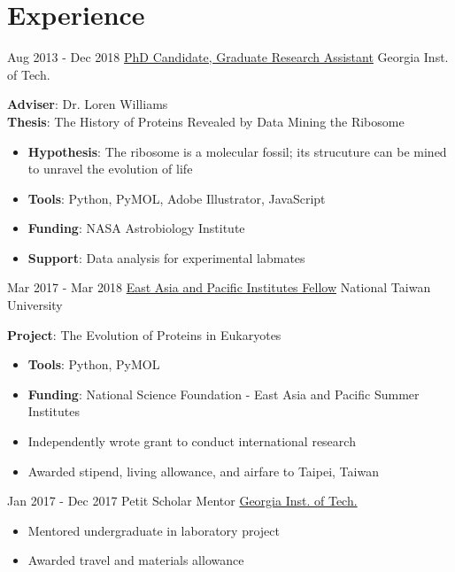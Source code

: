\documentclass[letterpaper]{twentysecondcv} %
\begin{document}
\section{Experience}
\begin{twenty}
	\twentyitem
    	{Aug 2013 -}
		{Dec 2018}
        {\href{https://ww2.chemistry.gatech.edu/~lw26/}{PhD Candidate, Graduate Research Assistant}}
        {Georgia Inst. of Tech.}
        {}
        {
        \textbf{Adviser}: Dr. Loren Williams \\ 
        \textbf{Thesis}: The History of Proteins Revealed by Data Mining the Ribosome
        {\begin{itemize}
        \item \textbf{Hypothesis}: The ribosome is a molecular fossil; its strucuture can be mined to unravel the evolution of life 
        \item \textbf{Tools}: Python, PyMOL, Adobe Illustrator, JavaScript
        \item \textbf{Funding}: NASA Astrobiology Institute
        \item \textbf{Support}: Data analysis for experimental labmates
 \vspace{4mm}
		\end{itemize}}
        }

	\twentyitem
    	{Mar 2017 -}
		{Mar 2018}
        {\href{https://www.nsf.gov/funding/pgm_summ.jsp?pims_id=5284}{East Asia and Pacific Institutes Fellow}}
        {National Taiwan University}
        {}
        {
\vspace{-3mm}
		\textbf{Project}: The Evolution of Proteins in Eukaryotes
        {\begin{itemize}
        \item \textbf{Tools}: Python, PyMOL
        \item \textbf{Funding}: National Science Foundation \scriptsize{- East Asia and Pacific Summer Institutes}
        \item \normalsize{Independently wrote grant to conduct international research}
        \item Awarded stipend, living allowance, and airfare to Taipei, Taiwan
 \vspace{4mm}
		\end{itemize}}
        }

	\twentyitem
    	{Jan 2017 -}
		{Dec 2017}
        {Petit Scholar Mentor}
        {\href{http://petitinstitute.gatech.edu/become-petit-scholar-mentor}{Georgia Inst. of Tech.}}
        {}
        {
\vspace{-3mm}
        {\begin{itemize}
        \item Mentored undergraduate in laboratory project
        \item Awarded travel and materials allowance
 \vspace{4mm}
		\end{itemize}}
        }


\end{twenty}
\end{document}
